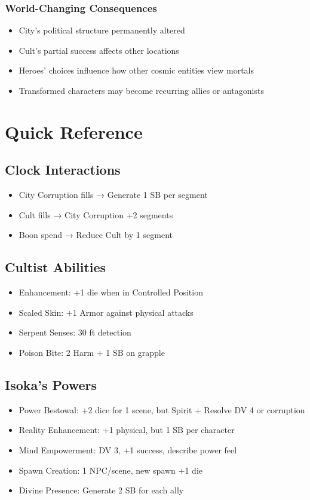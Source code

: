 \documentclass[11pt]{article}
\begin{document}
\subsubsection{World-Changing Consequences}
\begin{itemize}[leftmargin=*]
    \item City's political structure permanently altered
    \item Cult's partial success affects other locations
    \item Heroes' choices influence how other cosmic entities view mortals
    \item Transformed characters may become recurring allies or antagonists
\end{itemize}

\newpage

\section{Quick Reference}

\subsection{Clock Interactions}
\begin{itemize}[leftmargin=*]
    \item City Corruption fills → Generate 1 SB per segment
    \item Cult fills → City Corruption +2 segments
    \item Boon spend → Reduce Cult by 1 segment
\end{itemize}

\subsection{Cultist Abilities}
\begin{itemize}[leftmargin=*]
    \item Enhancement: +1 die when in Controlled Position
    \item Scaled Skin: +1 Armor against physical attacks
    \item Serpent Senses: 30 ft detection
    \item Poison Bite: 2 Harm + 1 SB on grapple
\end{itemize}

\subsection{Isoka's Powers}
\begin{itemize}[leftmargin=*]
    \item Power Bestowal: +2 dice for 1 scene, but Spirit + Resolve DV 4 or corruption
    \item Reality Enhancement: +1 physical, but 1 SB per character
    \item Mind Empowerment: DV 3, +1 success, describe power feel
    \item Spawn Creation: 1 NPC/scene, new spawn +1 die
    \item Divine Presence: Generate 2 SB for each ally
\end{itemize}
\end{document}

